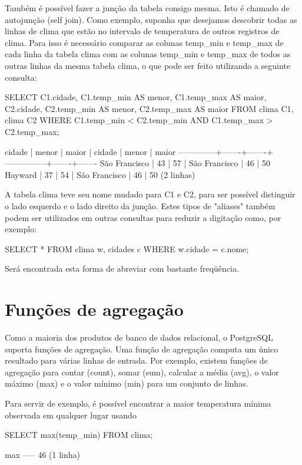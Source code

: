 Também é possível fazer a junção da tabela consigo mesma. Isto é chamado de autojunção (self join). Como exemplo, suponha que desejamos descobrir todas as linhas de clima que estão no intervalo de temperatura de outros registros de clima. Para isso é necessário comparar as colunas temp\_min e temp\_max de cada linha da tabela clima com as colunas temp\_min e temp\_max de todos as outras linhas da mesma tabela clima, o que pode ser feito utilizando a seguinte consulta:
\begin{BoxVerbatim}
SELECT C1.cidade, C1.temp_min AS menor, C1.temp_max AS maior,
    C2.cidade, C2.temp_min AS menor, C2.temp_max AS maior
    FROM clima C1, clima C2
    WHERE C1.temp_min < C2.temp_min
    AND C1.temp_max > C2.temp_max;



 cidade          | menor | maior |     cidade    | menor | maior
   --------------+-------+-------+---------------+-------+-------
 São Francisco   |    43 |    57 | São Francisco |    46 |    50
 Hayward         |    37 |    54 | São Francisco |    46 |    50
 (2 linhas)
\end{BoxVerbatim}

A tabela clima teve seu nome mudado para C1 e C2, para ser possível distinguir o lado esquerdo e o lado direito da junção. Estes tipos de "aliases" também podem ser utilizados em outras consultas para reduzir a digitação como, por exemplo:

\begin{BoxVerbatim}
SELECT *
    FROM clima w, cidades c
    WHERE w.cidade = c.nome;
\end{BoxVerbatim}
Será encontrada esta forma de abreviar com bastante freqüência.

\section{ Funções de agregação }\setcounter{SteP}{1}
Como a maioria dos produtos de banco de dados relacional, o PostgreSQL suporta funções de agregação. Uma função de agregação computa um único resultado para várias linhas de entrada. Por exemplo, existem funções de agregação para contar (count), somar (sum), calcular a média (avg), o valor máximo (max) e o valor mínimo (min) para um conjunto de linhas.

Para servir de exemplo, é possível encontrar a maior temperatura mínima observada em qualquer lugar usando
\begin{BoxVerbatim}
SELECT max(temp_min) FROM clima;

 max
 -----
   46
 (1 linha)
\end{BoxVerbatim}

